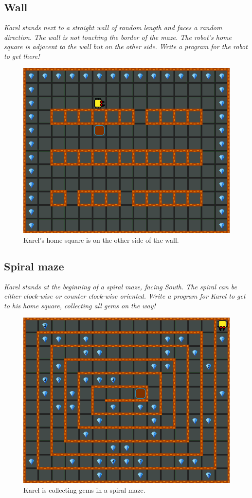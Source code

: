 \subsection{Wall}

{\em Karel stands next to a straight wall of random length and faces a random direction. The wall is not touching the border of the maze. The robot's home square is adjacent to the wall but on the other side. Write a program for the robot to get there!}\\[-7mm]

\begin{figure}[!ht]
\begin{center}
\includegraphics[height=0.4\textwidth]{img/e02.png}
\end{center}
\vspace{-4mm}
\caption{Karel's home square is on the other side of the wall.}
\label{fig:e03}
\vspace{-10mm}
\end{figure}

\subsection{Spiral maze}

{\em Karel stands at the beginning of a spiral maze, facing South. The spiral can be either clock-wise or counter clock-wise oriented. Write a program for Karel to get to his home square, collecting all gems on the way!}\\[-7mm]

\begin{figure}[!ht]
\begin{center}
\includegraphics[height=0.4\textwidth]{img/e03.png}
\end{center}
\vspace{-4mm}
\caption{Karel is collecting gems in a spiral maze.}
\label{fig:e04}
\vspace{-10mm}
\end{figure}
\newpage

